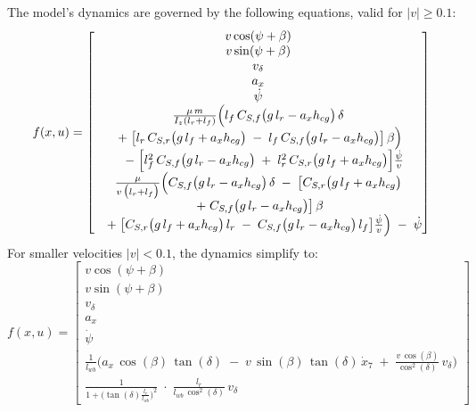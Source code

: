 The model's dynamics are governed by the following equations, valid for $|v|\geq0.1$:
\[
	f(x, u) = \begin{bmatrix}
		v\cos(\psi + \beta)                                  \\
		v\sin(\psi + \beta)                                  \\
		v_\delta                                             \\
		a_x                                                  \\
		\dot{\psi}                                           \\
		\frac{\mu\,m}{I_{z}(l_{r}+l_{f})}\Bigl(
		l_{f}\,C_{S,f}\bigl(g\,l_{r}-a_xh_{cg}\bigr)\,\delta \\
		\;+                                                 \;\bigl[l_{r}\,C_{S,r}\bigl(g\,l_{f}+a_xh_{cg}\bigr)
			\;-\;l_{f}\,C_{S,f}\bigl(g\,l_{r}-a_xh_{cg}\bigr)\bigr]\,\beta
		\Bigr)                                               \\
		\quad -\;\Bigl[
		l_{f}^{2}\,C_{S,f}\bigl(g\,l_{r}-a_xh_{cg}\bigr)
		\;+\;
		l_{r}^{2}\,C_{S,r}\bigl(g\,l_{f}+a_xh_{cg}\bigr)
		\Bigr]
		\frac{\dot{\psi}}{v}                                 \\
		\frac{\mu}{v\,\bigl(l_{r}+l_{f}\bigr)}\Bigl(
		C_{S,f}\bigl(g\,l_{r}-a_xh_{cg}\bigr)\,\delta
		\;-\;
		\bigl[C_{S,r}\bigl(g\,l_{f}+a_xh_{cg}\bigr)          \\
			\;+\;
		C_{S,f}\bigl(g\,l_{r}-a_xh_{cg}\bigr)\bigr]\,\beta   \\
		\quad +\;\bigl[
			C_{S,r}\bigl(g\,l_{f}+a_xh_{cg}\bigr)\,l_{r}
			\;-\;
			C_{S,f}\bigl(g\,l_{r}-a_xh_{cg}\bigr)\,l_{f}
			\bigr]
		\frac{\dot{\psi}}{v}
		\Bigr)
		\;-\;
		\dot{\psi}
	\end{bmatrix}
\]
For smaller velocities $|v|<0.1$, the dynamics simplify to:
\[
	f(x, u) = \begin{bmatrix}
		v\cos(\psi + \beta) \\
		v\sin(\psi + \beta) \\
		v_\delta            \\
		a_x                 \\
		\dot{\psi}          \\
		\frac{1}{l_{wb}}
		\biggl(
		a_x\,\cos( \beta)\,\tan(\delta)
		\;-\;
		v\,\sin( \beta)\,\tan(\delta)\,\dot{x}_{7}
		\;+\;
		\frac{v\,\cos( \beta)}{\cos^2(\delta)}\,
		v_{\delta}
		\biggr)
		\\
		\frac{1}{1 +
			\bigl(\tan(\delta)\tfrac{l_{r}}{l_{wb}}\bigr)^2}
		\;\cdot\;
		\frac{l_{r}}{l_{wb}\,\cos^2(\delta)}\,
		v_{\delta}
	\end{bmatrix}
\]

